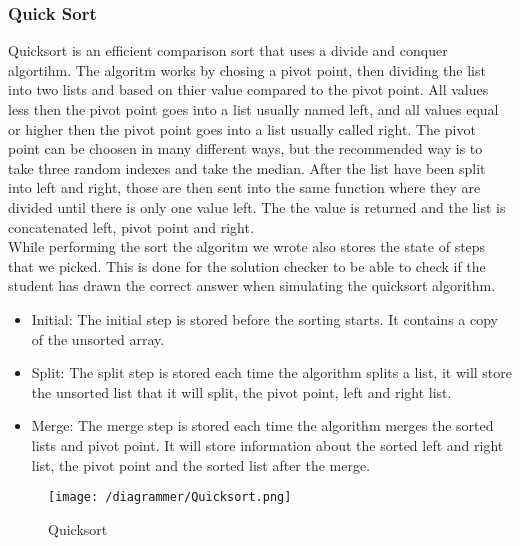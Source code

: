 \subsubsection{Quick Sort}
Quicksort is an efficient comparison sort that uses a divide and conquer algortihm. The algoritm works by chosing a pivot point, then dividing the list into two lists and based on thier value compared to the pivot point. All values less then the pivot point goes into a list usually named left, and all values equal or higher then the pivot point goes into a list usually called right. The pivot point can be choosen in many different ways, but the recommended way is to take three random indexes and take the median. After the list have been split into left and right, those are then sent into the same function where they are divided until there is only one value left. The the value is returned and the list is concatenated left, pivot point and right.
\\[11pt]
While performing the sort the algoritm we wrote also stores the state of steps that we picked. This is done for the solution checker to be able to check if the student has drawn the correct answer when simulating the quicksort algorithm.
\begin{itemize}
    \item Initial: The initial step is stored before the sorting starts. It contains a copy of the unsorted array.
    \item Split: The split step is stored each time the algorithm splits a list, it will store the unsorted list that it will split, the pivot point, left and right list.
    \item Merge: The merge step is stored each time the algorithm merges the sorted lists and pivot point. It will store information about the sorted left and right list, the pivot point and the sorted list after the merge.
\end{itemize}
\begin{figure}
    \texttt{[image: /diagrammer/Quicksort.png]}
    \caption{Quicksort}
    \label{fig:quicksort}
\end{figure}